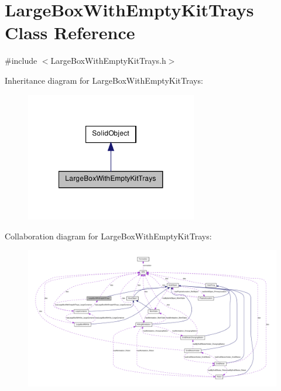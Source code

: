 \hypertarget{class_large_box_with_empty_kit_trays}{
\section{LargeBoxWithEmptyKitTrays Class Reference}
\label{class_large_box_with_empty_kit_trays}
}


{\ttfamily \#include $<$LargeBoxWithEmptyKitTrays.h$>$}



Inheritance diagram for LargeBoxWithEmptyKitTrays:\nopagebreak
\begin{figure}[H]
\begin{center}
\leavevmode
\includegraphics[width=212pt]{class_large_box_with_empty_kit_trays__inherit__graph}
\end{center}
\end{figure}


Collaboration diagram for LargeBoxWithEmptyKitTrays:\nopagebreak
\begin{figure}[H]
\begin{center}
\leavevmode
\includegraphics[width=400pt]{class_large_box_with_empty_kit_trays__coll__graph}
\end{center}
\end{figure}
